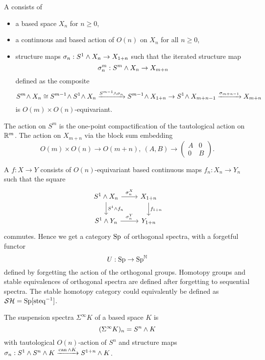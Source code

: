 \begin{definition!}
A  consists of
\begin{itemize}
    \item a based space $X_n$ for $n\geq0$,
    \item a continuous and based action of $O(n)$ on $X_n$ for all $n\geq0$,
    \item structure maps $\sigma_n:S^1\wedge X_n\to X_{1+n}$ such that the iterated structure map
    \[\sigma^m_n:S^m\wedge X_n\to X_{m+n}\]
    defined as the composite
    \[\small S^m\!\wedge X_n\cong S^{m-1}\!\wedge S^1\!\wedge X_n\xrightarrow{S^{m-1}\wedge\sigma_n}S^{m-1}\!\wedge X_{1+n}\to S^1\!\wedge X_{m+n-1}\xrightarrow{\sigma_{m+n-1}}X_{m+n}\]
    is $O(m)\times O(n)$-equivariant. 
\end{itemize}
The action on $S^m$ is the one-point compactification of the tautological action on ${\mathbb R}^m$. The action on $X_{m+n}$ via the block sum embedding
    \[O(m)\times O(n)\to O(m+n),\ (A,B)\to\begin{pmatrix} A & 0 \\ 0 & B\end{pmatrix}.\]
\end{definition!}

A  $f:X\to Y$ consists of $O(n)$-equivariant based continuous maps $f_n:X_n\to Y_n$ such that the square
\[
\begin{tikzcd}
S^1\smsh X_n \ar[r,"\sigma_n^X"] \ar[d,"S^1\smsh f_n"] & X_{1+n} \ar[d,"f_{1+n}"] \\
S^1\smsh Y_n \ar[r,"\sigma_n^Y"] & Y_{1+n}
\end{tikzcd}
\]
commutes. Hence we get a category ${\normalfont\textup{Sp}}$ of orthogonal spectra, with a forgetful functor
\[U:{\normalfont\textup{Sp}}\to{\normalfont\textup{Sp}}^{\mathbb N}\]
defined by forgetting the action of the orthogonal groups. Homotopy groups and stable equivalences of orthogonal spectra are defined after forgetting to sequential spectra. The stable homotopy category could equivalently be defined as $\mathcal{S}\mathcal{H}={\normalfont\textup{Sp}}[\operatorname{steq}^{-1}]$.

The suspension spectra $\Sigma^\infty K$ of a based space $K$ is
\[(\Sigma^\infty K)_n=S^n\wedge K\]
with tautological $O(n)$-action of $S^n$ and structure maps $\sigma_n:S^1\wedge S^n\wedge K\xrightarrow{\operatorname{can}\wedge K}S^{1+n}\wedge K$.

